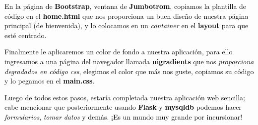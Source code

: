 \documentclass[a4paper]{article}
\begin{document}






\bigskip

{
\textcolor{black}{En la página de }\textbf{\textcolor{black}{Bootstrap}}\textcolor{black}{, ventana de
}\textbf{\textcolor{black}{Jumbotrom}}\textcolor{black}{, copiamos la plantilla de código en el
}\textbf{\textcolor{black}{home.html}}\textcolor{black}{ que nos proporciona un buen diseño de nuestra página principal
(de bienvenida), y lo colocamos en un }\textit{\textcolor{black}{container }}\textcolor{black}{en el
}\textbf{\textcolor{black}{layout}}\textcolor{black}{ para que esté centrado.}}





\bigskip





\bigskip

{
\textcolor{black}{Finalmente le aplicaremos un color de fondo a nuestra aplicación, para ello ingresamos a una página
del navegador llamada }\textbf{\textcolor{black}{uigradients}}\textcolor{black}{ que nos
}\textit{\textcolor{black}{proporciona degradados en código css}}\textcolor{black}{, elegimos el color que más nos
guste, copiamos su código y lo pegamos en el }\textbf{\textcolor{black}{main.css}}\textcolor{black}{.}}





\bigskip


\bigskip


\bigskip

{
\textcolor{black}{Luego de todos estos pasos, estaría completada nuestra aplicación web sencilla; cabe mencionar que
posteriormente usando }\textbf{\textcolor{black}{Flask}}\textcolor{black}{ y
}\textbf{\textcolor{black}{mysqldb}}\textcolor{black}{ podemos hacer
}\textit{\textcolor{black}{formularios}}\textcolor{black}{, }\textit{\textcolor{black}{tomar}}\textcolor{black}{
}\textit{\textcolor{black}{datos}}\textcolor{black}{ y demás. ¡Es un mundo muy grande por incursionar!}}
\end{document}
